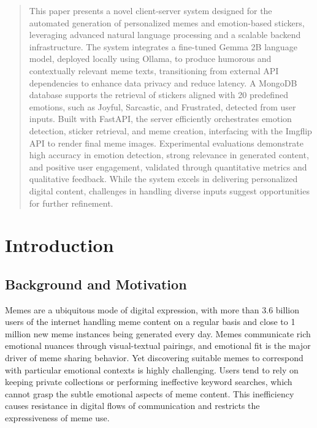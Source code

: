 \documentclass[conference]{IEEEtran}
\begin{document}
\begin{abstract}
This paper presents a novel client-server system designed for the automated generation of personalized memes and emotion-based stickers, leveraging advanced natural language processing and a scalable backend infrastructure. The system integrates a fine-tuned Gemma 2B language model, deployed locally using Ollama, to produce humorous and contextually relevant meme texts, transitioning from external API dependencies to enhance data privacy and reduce latency. A MongoDB database supports the retrieval of stickers aligned with 20 predefined emotions, such as Joyful, Sarcastic, and Frustrated, detected from user inputs. Built with FastAPI, the server efficiently orchestrates emotion detection, sticker retrieval, and meme creation, interfacing with the Imgflip API to render final meme images. Experimental evaluations demonstrate high accuracy in emotion detection, strong relevance in generated content, and positive user engagement, validated through quantitative metrics and qualitative feedback. While the system excels in delivering personalized digital content, challenges in handling diverse inputs suggest opportunities for further refinement.
\end{abstract}


\section{Introduction}

\subsection{Background and Motivation}
Memes are a ubiquitous mode of digital expression, with more than 3.6 billion users of the internet handling meme content on a regular basis and close to 1 million new meme instances being generated every day. Memes communicate rich emotional nuances through visual-textual pairings, and emotional fit is the major driver of meme sharing behavior. Yet discovering suitable memes to correspond with particular emotional contexts is highly challenging. Users tend to rely on keeping private collections or performing ineffective keyword searches, which cannot grasp the subtle emotional aspects of meme content. This inefficiency causes resistance in digital flows of communication and restricts the expressiveness of meme use.
\end{document}
